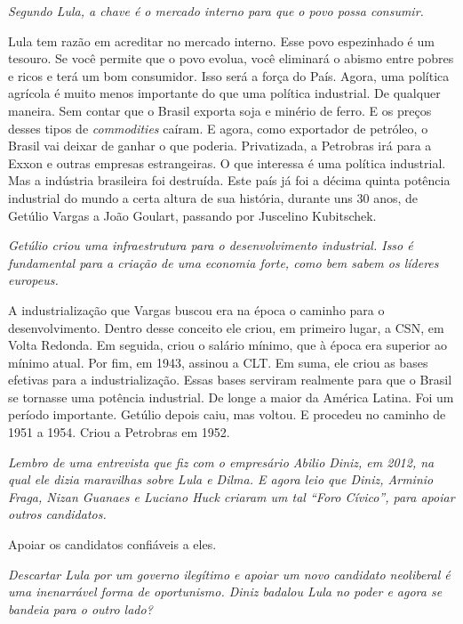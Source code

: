 \itshape
 Segundo Lula, a chave é o mercado interno para que o
povo possa consumir.

\normalfont 
Lula tem razão em acreditar no mercado interno. Esse povo
espezinhado é um tesouro. Se você permite que o povo evolua, você
eliminará o abismo entre pobres e ricos e terá um bom consumidor. Isso
será a força do País. Agora, uma política agrícola é muito menos
importante do que uma política industrial. De qualquer maneira. Sem
contar que o Brasil exporta soja e minério de ferro. E os preços desses
tipos de \emph{commodities} caíram. E agora, como exportador de
petróleo, o Brasil vai deixar de ganhar o que poderia. Privatizada, a
Petrobras irá para a Exxon e outras empresas estrangeiras. O que
interessa é uma política industrial. Mas a indústria brasileira foi
destruída. Este país já foi a décima quinta potência industrial do mundo
a certa altura de sua história, durante uns 30 anos, de Getúlio Vargas a
João Goulart, passando por Juscelino Kubitschek.

\itshape
 Getúlio criou uma infraestrutura para o desenvolvimento
industrial. Isso é fundamental para a criação de uma economia forte,
como bem sabem os líderes europeus.

\normalfont 
A industrialização que Vargas buscou era na época o
caminho para o desenvolvimento. Dentro desse conceito ele criou, em
primeiro lugar, a CSN, em Volta Redonda. Em seguida, criou o salário
mínimo, que à época era superior ao mínimo atual. Por fim, em 1943,
assinou a CLT. Em suma, ele criou as bases efetivas para a
industrialização. Essas bases serviram realmente para que o Brasil se
tornasse uma potência industrial. De longe a maior da América Latina.
Foi um período importante. Getúlio depois caiu, mas voltou. E procedeu
no caminho de 1951 a 1954. Criou a Petrobras em 1952.

\itshape
 Lembro de uma entrevista que fiz com o empresário
Abilio Diniz, em 2012, na qual ele dizia maravilhas sobre Lula e Dilma.
E agora leio que Diniz, Arminio Fraga, Nizan Guanaes e Luciano Huck
criaram um tal ``Foro Cívico'', para apoiar outros candidatos.

\normalfont 
Apoiar os candidatos confiáveis a eles.

\itshape
 Descartar Lula por um governo ilegítimo e apoiar um
novo candidato neoliberal é uma inenarrável forma de oportunismo. Diniz
badalou Lula no poder e agora se bandeia para o outro lado?

